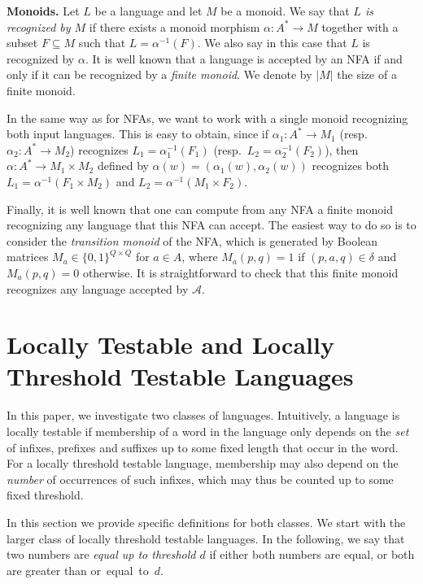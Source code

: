 \documentclass{LMCS}
\theoremstyle{plain}
\begin{document}
\smallskip\noindent
{\textbf{Monoids.}}
Let $L$ be a language and let $M$ be a monoid. We say that \emph{$L$ is recognized
  by $M$} if there exists a monoid morphism $\alpha: A^* \rightarrow
M$ together with a subset $F \subseteq M$ such that $L = \alpha^{-1}(F)$. We
also say in this case that $L$ is recognized by $\alpha$. It is
well known that a language is accepted by an NFA if and only if it can be
recognized by a \emph{finite monoid}. We denote by $|M|$ the size of a finite monoid.

In the same way as for NFAs, we want to work with a single monoid recognizing
both input languages. This is easy to obtain, since if $\alpha_1:A^*\to M_1$
(resp.~$\alpha_2:A^*\to M_2$) recognizes $L_1=\alpha_1^{-1}(F_1)$ (resp.~$L_2=\alpha_2^{-1}(F_2)$), then $\alpha:A^*\to M_1\times M_2$ defined by
$\alpha(w)=(\alpha_1(w),\alpha_2(w))$ recognizes both
$L_1=\alpha^{-1}(F_1\times M_2)$ and $L_2=\alpha^{-1}(M_1\times F_2)$.

Finally, it is well known that one can compute from any NFA a finite monoid
recognizing any language that this NFA can accept.  The easiest way to do so is to consider
the \emph{transition monoid} of the NFA, which is generated by Boolean
matrices $M_a\in \{0,1\}^{Q\times Q}$ for $a\in A$, where $M_a(p,q)=1$ if
$(p,a,q)\in\delta$ and $M_a(p,q)=0$ otherwise. It is straightforward to check
that this finite monoid recognizes any language accepted by $\mathcal{A}$.








\section{Locally Testable and Locally Threshold Testable Languages}
\label{sec:classdef}
\makeatletter{}



In this paper, we investigate two classes of languages. Intuitively, a language is locally testable if membership of a word in
the language only depends on the \emph{set} of infixes, prefixes and
suffixes up to some fixed length that occur in the word. For a locally
threshold testable language, membership may also depend on the \emph{number}
of occurrences of such infixes, which may thus be counted up to some
fixed threshold.

\smallskip
In this section we provide specific definitions for both classes. We
start with the larger class of locally threshold testable
languages. In the following, we say that two numbers are \emph{equal
  up to threshold $d$} if either both numbers are equal, or both are
greater than or~equal~to~$d$.
\end{document}
